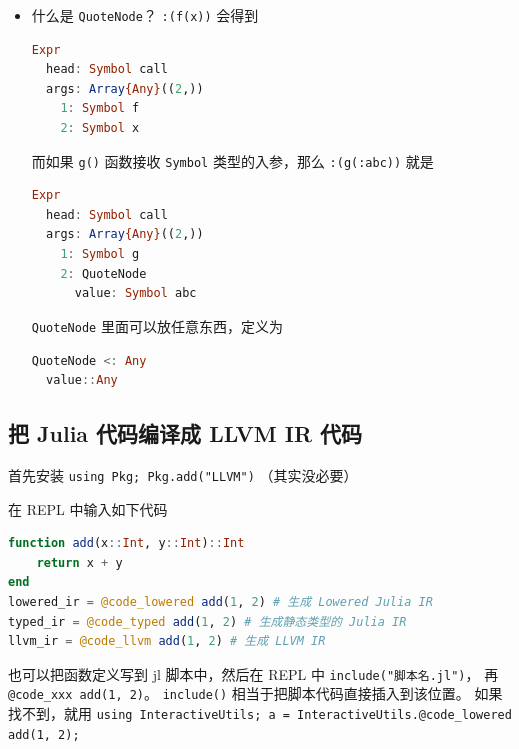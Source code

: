 \begin{itemize}
\begin{lstlisting}[language=julia]
        a::Int64
        b::String
    end
end
\end{lstlisting}
\verb`dump(Base.remove_linenums!(st))` 的结果是
\begin{lstlisting}[language=julia]
Expr
  head: Symbol block
  args: Array{Any}((1,))
    1: Expr
      head: Symbol struct
      args: Array{Any}((3,))
        1: Bool false
        2: Symbol MySt
        3: Expr
          head: Symbol block
          args: Array{Any}((2,))
            1: Expr
              head: Symbol ::
              args: Array{Any}((2,))
                1: Symbol a
                2: Symbol Int64
            2: Expr
              head: Symbol ::
              args: Array{Any}((2,))
                1: Symbol b
                2: Symbol String
\end{lstlisting}
\item 什么是 \verb`QuoteNode`？ \verb`:(f(x))` 会得到
\begin{lstlisting}[language=julia]
Expr
  head: Symbol call
  args: Array{Any}((2,))
    1: Symbol f
    2: Symbol x
\end{lstlisting}
而如果 \verb`g()` 函数接收 \verb`Symbol` 类型的入参，那么 \verb`:(g(:abc))` 就是
\begin{lstlisting}[language=julia]
Expr
  head: Symbol call
  args: Array{Any}((2,))
    1: Symbol g
    2: QuoteNode
      value: Symbol abc
\end{lstlisting}
\verb`QuoteNode` 里面可以放任意东西，定义为
\begin{lstlisting}[language=julia]
QuoteNode <: Any
  value::Any
\end{lstlisting}
\end{itemize}


\subsection{把 Julia 代码编译成 LLVM IR 代码}
首先安装 \verb`using Pkg; Pkg.add("LLVM")` （其实没必要）

在 REPL 中输入如下代码
\begin{lstlisting}[language=julia,caption=julia]
function add(x::Int, y::Int)::Int
    return x + y
end
lowered_ir = @code_lowered add(1, 2) # 生成 Lowered Julia IR
typed_ir = @code_typed add(1, 2) # 生成静态类型的 Julia IR
llvm_ir = @code_llvm add(1, 2) # 生成 LLVM IR
\end{lstlisting}

也可以把函数定义写到 jl 脚本中，然后在 REPL 中 \verb`include("脚本名.jl")`， 再 \verb`@code_xxx add(1, 2)`。 \verb`include()` 相当于把脚本代码直接插入到该位置。 如果找不到，就用 \verb`using InteractiveUtils; a = InteractiveUtils.@code_lowered add(1, 2);`

